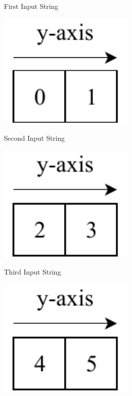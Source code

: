 \documentclass[12pt]{article}
\begin{document}
\begin{tcbraster}[raster columns=3,raster rows=1,
	enhanced,size=small,fit algorithm=hybrid* ]
	\begin{inlinefigure}{First Input String}
		\begin{center}
			\includegraphics[width=0.5\textwidth]{input1}
		\end{center}
	\end{inlinefigure}
	\begin{inlinefigure}{Second Input String}
		\begin{center}
			\includegraphics[width=0.5\textwidth]{input2}
		\end{center}
	\end{inlinefigure}
	\begin{inlinefigure}{Third Input String}
		\begin{center}
			\includegraphics[width=0.5\textwidth]{input3}
		\end{center}
	\end{inlinefigure}
\end{tcbraster}
\vspace{10pt}
\end{document}
